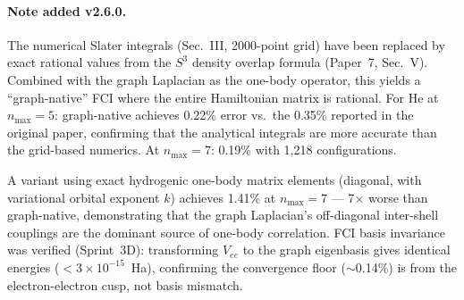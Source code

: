 \documentclass[aps,pra,twocolumn,superscriptaddress,longbibliography,floatfix]{revtex4-2}
\begin{document}
\paragraph{Note added v2.6.0.}
The numerical Slater integrals (Sec.~III, 2000-point grid) have been
replaced by exact rational values from the $S^3$ density overlap
formula (Paper~7, Sec.~V).  Combined with the graph Laplacian as the
one-body operator, this yields a ``graph-native'' FCI where the
entire Hamiltonian matrix is rational.  For He at $n_{\max} = 5$:
graph-native achieves 0.22\% error vs.\ the 0.35\% reported in
the original paper, confirming that the analytical integrals are more
accurate than the grid-based numerics.  At $n_{\max} = 7$: 0.19\%
with 1,218 configurations.

A variant using exact hydrogenic one-body matrix elements (diagonal,
with variational orbital exponent $k$) achieves 1.41\% at
$n_{\max} = 7$ --- 7$\times$ worse than graph-native, demonstrating
that the graph Laplacian's off-diagonal inter-shell couplings are
the dominant source of one-body correlation.  FCI basis invariance
was verified (Sprint~3D): transforming $V_{ee}$ to the graph
eigenbasis gives identical energies ($< 3 \times 10^{-15}$~Ha),
confirming the convergence floor ($\sim$0.14\%) is from the
electron-electron cusp, not basis mismatch.
\end{document}
